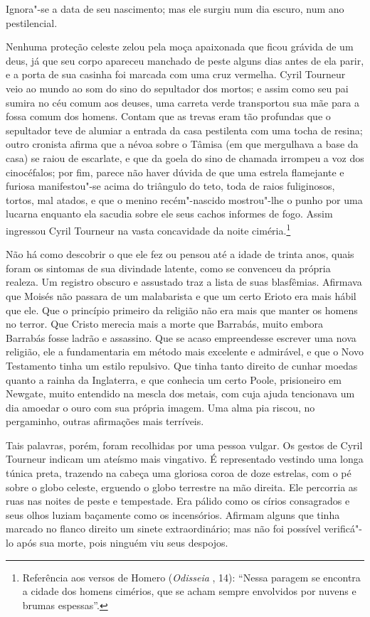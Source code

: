 Ignora"-se a data de seu nascimento; mas ele surgiu num dia escuro, num ano
pestilencial.

Nenhuma proteção celeste zelou pela moça apaixonada que ficou grávida de um
deus, já que seu corpo apareceu manchado de peste alguns dias antes de ela
parir, e a porta de sua casinha foi marcada com uma cruz vermelha. Cyril
Tourneur veio ao mundo ao som do sino do sepultador dos mortos; e assim
como seu pai sumira no céu comum aos deuses, uma carreta verde transportou
sua mãe para a fossa comum dos homens. Contam que as trevas eram tão
profundas que o sepultador teve de alumiar a entrada da casa pestilenta
com uma tocha de resina; outro cronista afirma que a névoa sobre o Tâmisa
(em que mergulhava a base da casa) se raiou de escarlate, e que da goela
do sino de chamada irrompeu a voz dos cinocéfalos; por fim, parece não
haver dúvida de que uma estrela flamejante e furiosa manifestou"-se acima
do triângulo do teto, toda de raios fuliginosos, tortos, mal atados, e que
o menino recém"-nascido mostrou"-lhe o punho por uma lucarna enquanto ela
sacudia sobre ele seus cachos informes de fogo. Assim ingressou Cyril
Tourneur na vasta concavidade da noite ciméria.\footnote{ Referência aos
versos de Homero (\textit{Odisseia} , 14): ``Nessa paragem
se encontra a cidade dos homens cimérios, que se acham sempre envolvidos
por nuvens e brumas espessas''.}

Não há como descobrir o que ele fez ou pensou até a idade de trinta anos,
quais foram os sintomas de sua divindade latente, como se convenceu da
própria realeza. Um registro obscuro e assustado traz a lista de suas
blasfêmias. Afirmava que Moisés não passara de um malabarista e que um
certo Erioto era mais hábil que ele. Que o princípio primeiro da religião
não era mais que manter os homens no terror. Que Cristo merecia mais a
morte que Barrabás, muito embora Barrabás fosse ladrão e assassino. Que se
acaso empreendesse escrever uma nova religião, ele a fundamentaria em
método mais excelente e admirável, e que o Novo Testamento tinha um estilo
repulsivo. Que tinha tanto direito de cunhar moedas quanto a rainha da
Inglaterra, e que conhecia um certo Poole, prisioneiro em Newgate, muito
entendido na mescla dos metais, com cuja ajuda tencionava um dia amoedar o
ouro com sua própria imagem. Uma alma pia riscou, no pergaminho, outras
afirmações mais terríveis.

Tais palavras, porém, foram recolhidas por uma pessoa vulgar. Os gestos de
Cyril Tourneur indicam um ateísmo mais vingativo. É representado vestindo
uma longa túnica preta, trazendo na cabeça uma gloriosa coroa de doze
estrelas, com o pé sobre o globo celeste, erguendo o globo terrestre na
mão direita. Ele percorria as ruas nas noites de peste e tempestade. Era
pálido como os círios consagrados e seus olhos luziam baçamente como os
incensórios. Afirmam alguns que tinha marcado no flanco direito um sinete
extraordinário; mas não foi possível verificá"-lo após sua morte, pois
ninguém viu seus despojos.


